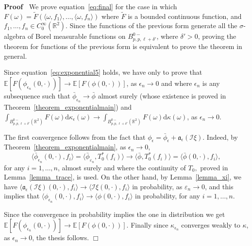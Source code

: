 \documentclass[a4paper,10pt]{article}
\newcommand{\asterisk}{\mathord{*}}
\newcommand{\mathd}{\mathrm{d}}
\newenvironment{proof}{\noindent\textbf{Proof\ }}{\hspace*{\fill}$\Box$\medskip}
\begin{document}
\begin{proof}
  We prove equation~{\eqref{eq:final}} for the case in which $F (\omega) =
  \tilde{F} (\langle \omega, f_1 \rangle, \ldots, \langle \omega, f_n
  \rangle)$ where $\tilde{F}$ is a bounded continuous function, and $f_1,
  \ldots, f_n \in C^{\infty}_0 (\mathbb{R}^2)$. Since the functions of the
  previous form generate all the $\sigma$-algebra of Borel measurable
  functions on $B^{0 -}_{p, p, \ell + \delta'}$, where $\delta' > 0$, proving
  the theorem for functions of the previous form is equivalent to prove the
  theorem in general.
  
  Since equation~{\eqref{eq:exponential5}} holds, we have only to prove that
  $\mathbb{E} [F (\phi_{\epsilon_n} (0, \cdot))] \rightarrow \mathbb{E} [F
  (\phi (0, \cdot))]$, as $\epsilon_n \rightarrow 0$ and where $\epsilon_n$ is
  any subsequence such that $\bar{\phi}_{\epsilon_n} \rightarrow \bar{\phi}$
  almost surely (whose existence is proved in
  Theorem~\ref{theorem_exponentialmain}) and $\int_{B^{0 -}_{p, p, \ell +
  \delta'} (\mathbb{R}^2)} F (\omega) \mathd \kappa_{\epsilon} (\omega)
  \rightarrow \int_{B^{0 -}_{p, p, \ell + \delta'} (\mathbb{R}^2)} F (\omega)
  \mathd \kappa (\omega)$, as $\epsilon_n \rightarrow 0$.
  
  The first convergence follows from the fact that $\phi_{\epsilon} =
  \bar{\phi}_{\epsilon} + \mathcal{\mathfrak{a_{\epsilon} (\mathcal{I}
  \xi)}}$. Indeed, by Theorem~\ref{theorem_exponentialmain}, as $\epsilon_n
  \rightarrow 0$,
  \[ \langle \bar{\phi}_{\epsilon_n} (0, \cdot), f_i \rangle = \langle
     \bar{\phi}_{\varepsilon_n}, T^{\asterisk}_0 (f_i) \rangle \rightarrow
     \langle \bar{\phi}, T^{\asterisk}_0 (f_i) \rangle = \langle \bar{\phi}
     (0, \cdot), f_i \rangle, \]
  for any $i = 1, \ldots, n$, almost surely and where the continuity of $T_0,$
  proved in Lemma~\ref{lemma_trace}, is used. On the other hand, by
  Lemma~\ref{lemma_xi}, we have $\langle \mathfrak{a}_{\epsilon} (\mathcal{I}
  \xi) (0, \cdot), f_i \rangle \rightarrow \langle \mathfrak{} \mathcal{I} \xi
  (0, \cdot), f_i \rangle$ in probability, as $\varepsilon_n \rightarrow 0$,
  and this implies that $\langle \phi_{\epsilon_n} (0, \cdot), f_i \rangle
  \rightarrow \langle \phi (0, \cdot), f_i \rangle$ in probability, for any $i
  = 1, \ldots, n$.
  
  Since the convergence in probability implies the one in distribution we get
  $\mathbb{E} [F (\phi_{\epsilon_n} (0, \cdot))] \rightarrow \mathbb{E} [F
  (\phi (0, \cdot))]$. Finally since $\kappa_{\epsilon_n}$ converges weakly to
  $\kappa$, as $\epsilon_n \rightarrow 0$, the thesis follows. 
\end{proof}
\end{document}
